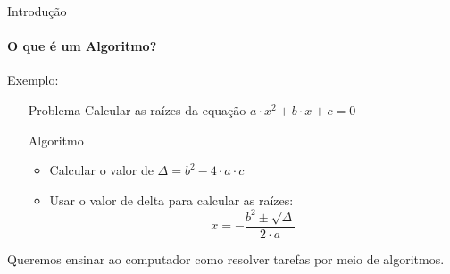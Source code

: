 \documentclass{beamer}
\begin{document}
  \begin{frame}{Introdução}
	\framesubtitle{O que é um Algoritmo?}
	Exemplo:
	\begin{itemize}
		\item[Problema] Calcular as raízes da equação $a\cdot x^{2} + b\cdot x + c = 0$
		\item[Algoritmo]
		\begin{itemize}
			\item Calcular o valor de $\Delta = b^{2} - 4\cdot a\cdot c$
			\item Usar o valor de delta para calcular as raízes:
			\begin{equation*}
				x = -\frac{b^{2}\pm \sqrt{\Delta}}{2\cdot a}
			\end{equation*}
		\end{itemize}
	\end{itemize}
	\pause
	Queremos ensinar ao computador como resolver tarefas por meio de algoritmos.
  \end{frame}
\end{document}
